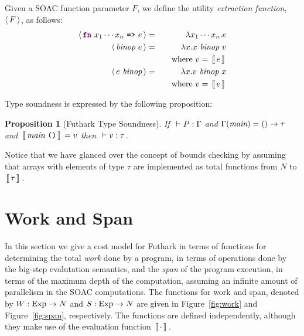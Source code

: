 \documentclass[11pt]{book}
\newtheorem{proposition}{Proposition}
\begin{document}
Given a SOAC function parameter $F$, we define the utility \emph{extraction function}, $\langle\,F\,\rangle$, as follows:
\begin{eqnarray*}
  \extractF{\fw{fn}~x_1\cdots x_n~\kw{=>}~ e} & = & \lambda x_1 \cdots x_n . e \\
  \extractF{\id{binop}~e} & = & \lambda x . x~\id{binop}~v \\
    & & ~~~\mathrm{where}~v = \Eval{e} \\
  \extractF{e~\id{binop}} & = & \lambda x . v~\id{binop}~x \\
    & & ~~~\mathrm{where}~v = \Eval{e}
\end{eqnarray*}

Type soundness is expressed by the following proposition:

\begin{proposition}[Futhark Type Soundness]
  If $~\vdash P : \Gamma$ and $\Gamma(\mbox{\it{main}}) = () \rightarrow \tau$ and
  $\,[\![\,\mbox{\it{main}}~\texttt{()}\,]\!]\, = v$ then $~\vdash v : \tau$.
\end{proposition}

Notice that we have glanced over the concept of bounds checking by
assuming that arrays with elements of type $\tau$ are implemented as
total functions from $N$ to $\,[\![\,\tau\,]\!]\,$.

\section{Work and Span}

In this section we give a cost model for Futhark in terms of functions
for determining the total \emph{work} done by a program, in terms of
operations done by the big-step evalutation semantics, and the
\emph{span} of the program execution, in terms of the maximum depth of
the computation, assuming an infinite amount of parallelism in the
SOAC computations. The functions for work and span, denoted by $W :
\mathrm{Exp} \rightarrow N$ and $S : \mathrm{Exp} \rightarrow N$ are
given in Figure~\ref{fig:work} and Figure~\ref{fig:span}, respectively. The functions are defined
independently, although they make use of the evaluation function
$\,[\![\,\cdot\,]\!]\,$.
\end{document}
